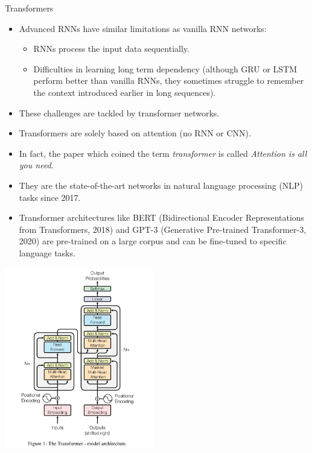 \begin{vbframe}{Transformers}
  \begin{itemize}
    \item Advanced RNNs have similar limitations as vanilla RNN networks:
    \begin{itemize}
      \item RNNs process the input data sequentially.
     \item Difficulties in learning long term dependency (although GRU or LSTM perform better than vanilla RNNs, they sometimes struggle to remember the context introduced earlier in long sequences).
    \end{itemize}
    \item These challenges are tackled by transformer networks.
    
    \framebreak
    
    \item Transformers are solely based on attention (no RNN or CNN).
    \item In fact, the paper which coined the term \textit{transformer} is called \textit{Attention is all you need}.
    \item They are the state-of-the-art networks in natural language processing (NLP) tasks since 2017.
    \item Transformer architectures like BERT (Bidirectional Encoder Representations from Transformers, 2018) and GPT-3 (Generative Pre-trained Transformer-3, 2020) are pre-trained on a large corpus and can be fine-tuned to specific language tasks.
  \end{itemize}

\framebreak

\begin{center}
\includegraphics[width=6.5cm]{plots/transformer.png}
\end{center}

\end{vbframe}


